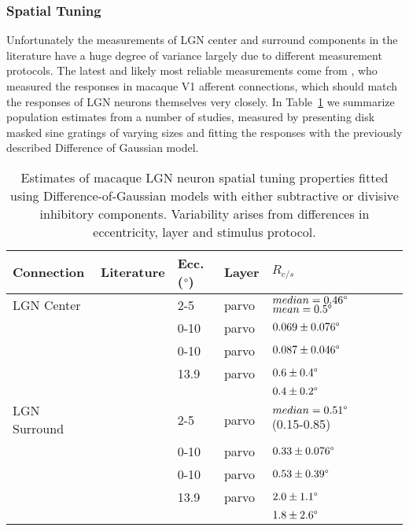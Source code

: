 \subsubsection*{Spatial Tuning}

Unfortunately the measurements of LGN center and surround components
in the literature have a huge degree of variance largely due to
different measurement protocols. The latest and likely most reliable
measurements come from \citep{Sceniak2006}, who measured the responses
in macaque V1 afferent connections, which should match the responses
of LGN neurons themselves very closely. In Table~\ref{LGNEstimates} we
summarize population estimates from a number of studies, measured by
presenting disk masked sine gratings of varying sizes and fitting the
responses with the previously described Difference of Gaussian model.

\begin{table}
  \centering
  \begin{adjustbox}{width=1\textwidth}
  \begin{tabular}{l | l l l l l l}
    Connection   & Literature            & Ecc. ($\degree$) & Layer & $R_{c/s}$ \\
    \hline
    LGN Center   & \cite{Sceniak2006}    & 2-5  & parvo & $median = 0.46\degree$ $mean = 0.5\degree$ \\
                 & \cite{Levitt2001}     & 0-10 & parvo & $0.069 \pm 0.076\degree$ \\
                 & \cite{Spear1994}      & 0-10 & parvo & $0.087 \pm 0.046\degree$ \\
                 & \cite{Bonin2005}      & 13.9 & parvo & $0.6 \pm 0.4\degree$\\
                 &                       &      &       & $0.4 \pm 0.2\degree$ \\
    \hline
    LGN Surround & \cite{Sceniak2006}    & 2-5  & parvo & $median = 0.51\degree$ (0.15-0.85) \\
                 & \cite{Levitt2001}     & 0-10 & parvo & $0.33 \pm 0.076\degree$ \\
                 & \cite{Spear1994}      & 0-10 & parvo & $0.53 \pm 0.39\degree$ \\
                 & \cite{Bonin2005}      & 13.9 & parvo & $2.0 \pm 1.1\degree$\\
                 &                       &      &       & $1.8 \pm 2.6\degree$\\

    \hline
  \end{tabular}
  \end{adjustbox}
  \caption[Estimates of macaque LGN spatial tuning.]{Estimates of
    macaque LGN neuron spatial tuning properties fitted using
    Difference-of-Gaussian models with either subtractive or divisive
    inhibitory components. Variability arises from differences in
    eccentricity, layer and stimulus protocol.}
  \label{LGNEstimates}
\end{table}

